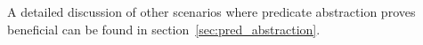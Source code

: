 A detailed discussion of other scenarios where predicate abstraction proves
beneficial can be found in section~\ref{sec:pred_abstraction}.


